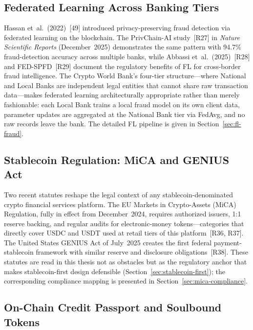 \documentclass[12pt,a4paper]{report}
\begin{document}
\subsection{Federated Learning Across Banking Tiers}
\label{sec:lit-fl}

Hassan et~al.~(2022)~[49] introduced privacy-preserving fraud detection via federated learning on the blockchain. The PrivChain-AI study~[R27] in \textit{Nature Scientific Reports} (December~2025) demonstrates the same pattern with 94.7\% fraud-detection accuracy across multiple banks, while Abbassi et~al.~(2025)~[R28] and FED-SPFD~[R29] document the regulatory benefits of FL for cross-border fraud intelligence. The Crypto World Bank's four-tier structure---where National and Local Banks are independent legal entities that cannot share raw transaction data---makes federated learning architecturally appropriate rather than merely fashionable: each Local Bank trains a local fraud model on its own client data, parameter updates are aggregated at the National Bank tier via FedAvg, and no raw records leave the bank. The detailed FL pipeline is given in Section~\ref{sec:fl-fraud}.

\subsection{Stablecoin Regulation: MiCA and GENIUS Act}
\label{sec:lit-stablecoin-reg}

Two recent statutes reshape the legal context of any stablecoin-denominated crypto financial services platform. The EU Markets in Crypto-Assets (MiCA) Regulation, fully in effect from December~2024, requires authorized issuers, 1{:}1 reserve backing, and regular audits for electronic-money tokens---categories that directly cover USDC and USDT used at retail tiers of this platform~[R36, R37]. The United States GENIUS Act of July~2025 creates the first federal payment-stablecoin framework with similar reserve and disclosure obligations~[R38]. These statutes are read in this thesis not as obstacles but as the regulatory anchor that makes stablecoin-first design defensible (Section~\ref{sec:stablecoin-first}); the corresponding compliance mapping is presented in Section~\ref{sec:mica-compliance}.

\subsection{On-Chain Credit Passport and Soulbound Tokens}
\label{sec:lit-sbt}
\end{document}

